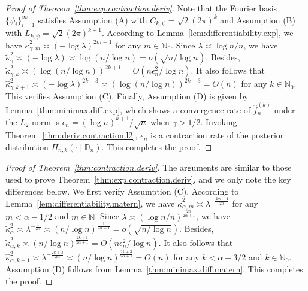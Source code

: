 \documentclass[12pt]{article}
\newcommand\data{\mathbb{D}_n}
\theoremstyle{plain}
\theoremstyle{nonitalicremark}
\begin{document}
\begin{appendices}
\begin{proof}[Proof of Theorem~\ref{thm:exp.contraction.deriv}]

Note that the Fourier basis $\{\psi_i\}_{i=1}^\infty$ satisfies Assumption (A) with $C_{k,\psi}=\sqrt{2}(2\pi)^k$ and Assumption (B) with $L_{k,\psi}=\sqrt{2}(2\pi)^{k+1}$. According to Lemma~\ref{lem:differentiability.exp}, we have $\tilde{\kappa}_{\gamma,m}^2\asymp (-\log \lambda)^{2m+1}$ for any $m\in\mathbb{N}_0$. Since $\lambda\asymp \log n/n$, we have $\tilde{\kappa}_\gamma^2\asymp (-\log\lambda) \asymp \log (n/\log n)=o(\sqrt{n/\log n})$. Besides, $\tilde{\kappa}_{\gamma,k}^2\asymp (\log (n/\log n) )^{2k+1} = O(n\epsilon_n^2/\log n)$. It also follows that $\hat{\kappa}_{\gamma,k+1}^2 \asymp (-\log \lambda)^{2k+3} \asymp (\log (n/\log n))^{2k+3}=O(n)$ for any $k\in\mathbb{N}_0$. This verifies Assumption (C). Finally, Assumption (D) is given by Lemma~\ref{thm:minimax.diff.exp}, which shows a convergence rate of $\hat{f}_n^{(k)}$ under the $L_2$ norm is $\epsilon_n=(\log n)^{k+1}/\sqrt{n}$ when $\gamma>1/2$. Invoking Theorem~\ref{thm:deriv.contraction.l2}, $\epsilon_n$ is a contraction rate of the posterior distribution $\Pi_{n,k}(\cdot \mid \data)$. This completes the proof. 
\end{proof}


\begin{proof}[Proof of Theorem~\ref{thm:contraction.deriv}]
The arguments are similar to those used to prove Theorem~\ref{thm:exp.contraction.deriv}, and we only note the key differences below. We first verify Assumption (C). According to Lemma~\ref{lem:differentiability.matern}, we have $\tilde{\kappa}_{\alpha,m}^2\asymp \lambda^{-\frac{2m+1}{2\alpha}}$ for any $m<\alpha-1/2$ and $m\in\mathbb{N}$. Since $\lambda\asymp (\log n/n)^{\frac{2\alpha}{2\alpha+1}}$, we have $\tilde{\kappa}_\alpha^2\asymp\lambda^{-\frac 1{2\alpha}}\asymp ({n}/{\log n})^{\frac{1}{2\alpha+1}}=o(\sqrt{n/\log n})$. Besides, $\tilde{\kappa}_{\alpha,k}^2\asymp (n/\log n )^{\frac{2k+1}{2\alpha+1}} = O(n\epsilon_n^2/\log n)$. It also follows that $\hat{\kappa}_{\alpha,k+1}^2\asymp \lambda^{-\frac{2k+3}{2\alpha}}\asymp\left(n/\log n\right)^{\frac{2k+3}{2\alpha+1}}=O(n)$ for any $k<\alpha-3/2$ and $k\in\mathbb{N}_0$. Assumption (D) follows from Lemma~\ref{thm:minimax.diff.matern}. This completes the proof. 
\end{proof}



\end{appendices}
\end{document}
